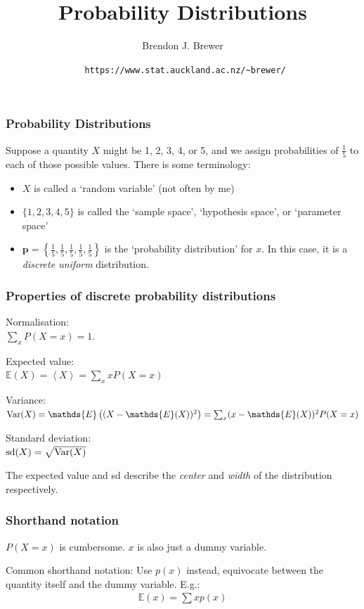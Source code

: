 \documentclass{beamer}
\title{Probability Distributions}
\author{Brendon J. Brewer}
\institute{Department of Statistics\\
The University of Auckland}
\date{{\tt \color{blue} https://www.stat.auckland.ac.nz/\~{ }brewer/}}
\begin{document}
\frame{\titlepage}


\begin{frame}
\frametitle{Probability Distributions}
Suppose a quantity $X$ might be 1, 2, 3, 4, or 5, and we assign probabilities of
$\frac{1}{5}$ to each of those possible values. There is some terminology:

\begin{itemize}
  \item<2-> $X$ is called a `random variable' (not often by me)
  \item<3-> $\{1, 2, 3, 4, 5\}$ is called the `sample space', `hypothesis space',
        or `parameter space'
  \item<4-> $\boldsymbol{p} = \left\{\frac{1}{5}, \frac{1}{5}, \frac{1}{5},
                \frac{1}{5}, \frac{1}{5}\right\}$
        is the `probability distribution' for
        $x$. In this case, it is a {\em discrete uniform} distribution.
\end{itemize}


\end{frame}



\begin{frame}
\frametitle{Properties of discrete probability distributions}

\pause
Normalisation:\\ $\sum_x P(X=x) = 1$.\vspace{0.5em}

\pause
Expected value:\\$\mathds{E}(X) = \left<X\right> = \sum_x x P(X=x)$\vspace{0.5em}

\pause
Variance:\\$\textnormal{Var}(X) = \mathds{E}\left((X - \mathds{E}(X))^2\right) = \sum_x (x - \mathds{E}(X))^2 P(X=x)$\vspace{0.5em}

\pause
Standard deviation:\\$\textnormal{sd}(X) = \sqrt{\textnormal{Var}(X)}$

\pause
The expected value and sd describe the {\em center} and {\em width}
of the distribution respectively.

\end{frame}


\begin{frame}
\frametitle{Shorthand notation}
$P(X=x)$ is cumbersome. $x$ is also just a dummy variable.

Common shorthand notation: 
Use $p(x)$ instead, equivocate between the quantity itself and the dummy
variable. E.g.:
\begin{align}
\mathds{E}(x) = \sum x p(x)
\end{align}

\end{frame}
\end{document}
